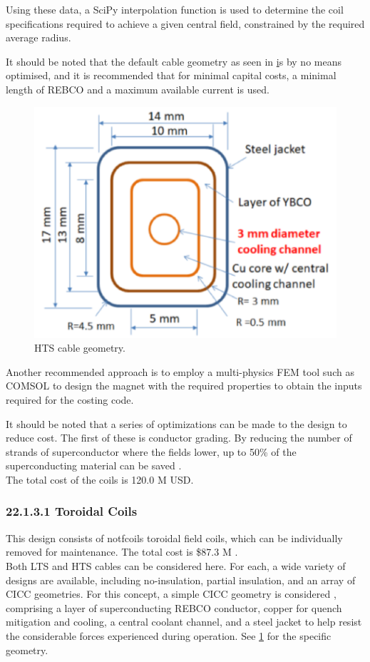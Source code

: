 Using these data, a SciPy interpolation function is used to determine the coil specifications required to achieve a given central field, constrained by the required average radius.

It should be noted that the default cable geometry as seen in \href{fig:yuhu_cs} is by no means optimised, and it is recommended that for minimal capital costs, a minimal length of REBCO and a maximum available current is used.


\begin{figure}[h]
    \centering
    \includegraphics[width =0.5\linewidth]{StandardFigures/yuhu_cs.pdf}
    \caption{HTS cable geometry.}
    \label{fig:yuhu_cs}
\end{figure}

Another recommended approach is to employ a multi-physics FEM tool such as COMSOL to design the magnet with the required properties to obtain the inputs required for the costing code.

It should be noted that a series of optimizations can be made to the design to reduce cost. The first of these is conductor grading. By reducing the number of strands of superconductor where the fields lower, up to 50\% of the superconducting material can be saved \cite{uglietti2018progressing}.\\

The total cost of the coils is 120.0 M USD.


\subsubsection*{22.1.3.1 Toroidal Coils}

This design consists of notfcoils toroidal field coils, which can be individually removed for maintenance. The total cost is \$87.3 M .\\

Both LTS and HTS cables can be considered here. For each, a wide variety of designs are available, including no-insulation, partial insulation, and an array of CICC geometries. For this concept, a simple CICC geometry is considered \cite{Menard2016}, comprising a layer of superconducting REBCO conductor, copper for quench mitigation and cooling, a central coolant channel, and a steel jacket to help resist the considerable forces experienced during operation. See \ref{fig:yuhu_cs} for the specific geometry.\\

